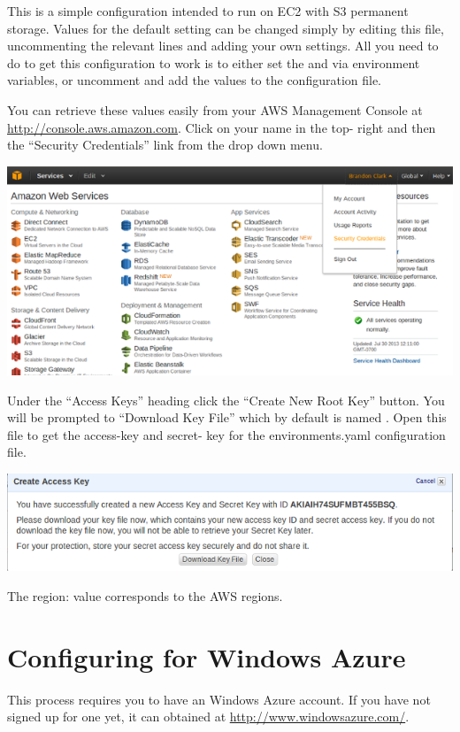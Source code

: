 \documentclass[letterpaper,10pt,english]{sphinxmanual}
\begin{document}
This is a simple configuration intended to run on EC2 with S3
permanent storage. Values for the default setting can be changed
simply by editing this file, uncommenting the relevant lines and
adding your own settings. All you need to do to get this configuration
to work is to either set the  and
 via environment variables, or uncomment and
add the values to the configuration file.

You can retrieve these values easily from your AWS Management Console
at \href{http://console.aws.amazon.com}{http://console.aws.amazon.com}. Click on your name in the top-
right and then the ``Security Credentials'' link from the drop down
menu.

\includegraphics{getting_started-aws_security.png}

Under the ``Access Keys'' heading click the ``Create New Root Key''
button. You will be prompted to ``Download Key File'' which by default
is named . Open this file to get the access-key and secret-
key for the environments.yaml configuration file.

\includegraphics{getting_started-aws_keys.png}

The region: value corresponds to the AWS regions.


\chapter{Configuring for Windows Azure}
\label{config-azure:configuring-for-windows-azure}\label{config-azure:http-console-aws-amazon-com}\label{config-azure::doc}
This process requires you to have an Windows Azure account. If you
have not signed up for one yet, it can obtained at
\href{http://www.windowsazure.com/}{http://www.windowsazure.com/}.
\end{document}
